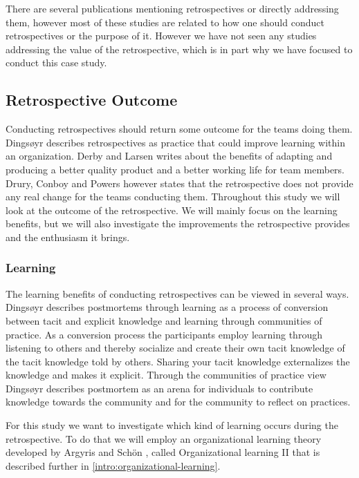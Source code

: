 There are several publications mentioning retrospectives or directly addressing them, however most of these studies are related to how one should conduct retrospectives or the purpose of it. However we have not seen any studies addressing the value of the retrospective, which is in part why we have focused to conduct this case study. 

\subsection{Retrospective Outcome}
\label{intro:retro-outcome}
Conducting retrospectives should return some outcome for the teams doing them. Dingsøyr \cite{Dingsoyr2004} describes retrospectives as practice that could improve learning within an organization. Derby and Larsen \cite{Larsen2006} writes about the benefits of adapting and producing a better quality product and a better working life for team members. Drury, Conboy and Powers \cite{Drury2012} however states that the retrospective does not provide any real change for the teams conducting them. Throughout this study we will look at the outcome of the retrospective. We will mainly focus on the learning benefits, but we will also investigate the improvements the retrospective provides and the enthusiasm it brings. 

\subsubsection{Learning}
The learning benefits of conducting retrospectives can be viewed in several ways. Dingsøyr \cite{Dingsoyr2004} describes postmortems through learning as a process of conversion between tacit and explicit knowledge and learning through communities of practice. As a conversion process the participants employ learning through listening to others and thereby socialize and create their own tacit knowledge of the tacit knowledge told by others. Sharing your tacit knowledge externalizes the knowledge and makes it explicit. Through the communities of practice view Dingsøyr describes postmortem as an arena for individuals to contribute knowledge towards the community and for the community to reflect on practices. 

For this study we want to investigate which kind of learning occurs during the retrospective. To do that we will employ an organizational learning theory developed by Argyris and Schön \cite{Argyris1996}, called Organizational learning II that is described further in \autoref{intro:organizational-learning}. 

